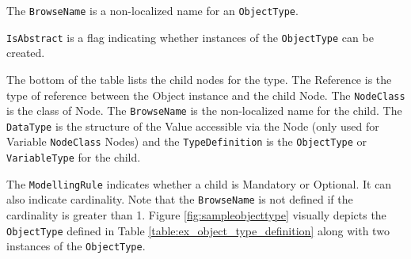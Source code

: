 The \texttt{BrowseName} is a non-localized name for an \texttt{ObjectType}. 

\texttt{IsAbstract} is a flag indicating whether instances of the \texttt{ObjectType} can be created.

The bottom of the table lists the child nodes for the type. The Reference is the type of reference between the Object instance and the child Node. The \texttt{NodeClass} is the class of Node. The \texttt{BrowseName} is the non-localized name for the child. The \texttt{DataType} is the structure of the Value accessible via the Node (only used for Variable \texttt{NodeClass} Nodes) and the \texttt{TypeDefinition} is the \texttt{ObjectType} or \texttt{VariableType} for the child. 

The \texttt{ModellingRule} indicates whether a child is Mandatory or Optional. It can also indicate cardinality. Note that the \texttt{BrowseName} is not defined if the cardinality is greater than 1. Figure \ref{fig:sampleobjecttype} visually depicts the \texttt{ObjectType} defined in Table \ref{table:ex_object_type_definition} along with two instances of the \texttt{ObjectType}.


\FloatBarrier
\fi